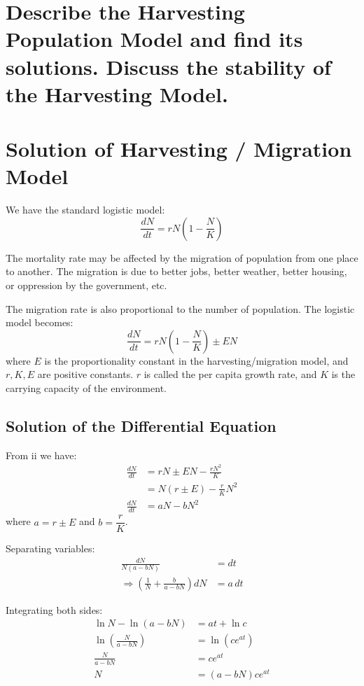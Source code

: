 \section{Describe the Harvesting Population Model and find its solutions. Discuss the stability of the Harvesting Model.}
\section*{Solution of Harvesting / Migration Model}

We have the standard logistic model:
\begin{equation}
\frac{dN}{dt} = rN \left(1 - \frac{N}{K}\right) \tag{i}
\end{equation}

The mortality rate may be affected by the migration of population from one place to another. The migration is due to better jobs, better weather, better housing, or oppression by the government, etc.

The migration rate is also proportional to the number of population. The logistic model becomes:
\begin{equation}
\frac{dN}{dt} = rN \left(1 - \frac{N}{K}\right) \pm EN \tag{ii}
\end{equation}
where $E$ is the proportionality constant in the harvesting/migration model, and $r, K, E$ are positive constants. $r$ is called the per capita growth rate, and $K$ is the carrying capacity of the environment.

\subsection*{Solution of the Differential Equation}

From ii we have:
\begin{align*}
\frac{dN}{dt} &= rN \pm EN - \frac{rN^2}{K} \\
&= N(r \pm E) - \frac{r}{K}N^2 \\
\frac{dN}{dt} &= aN - bN^2 \tag{A}
\end{align*}
where $a = r \pm E$ and $b = \dfrac{r}{K}$.

Separating variables:
\begin{align*}
\frac{dN}{N(a - bN)} &= dt\\
\Rightarrow \left( \frac{1}{N} + \frac{b}{a - bN} \right) dN &= a \, dt
\end{align*}

Integrating both sides:
\begin{align*}
\ln N - \ln(a - bN) &= at + \ln c \\
\ln \left( \frac{N}{a - bN} \right) &= \ln \left( c e^{at} \right) \\
\frac{N}{a - bN} &= c e^{at} \\
N &= (a - bN) c e^{at} \tag{iii}
\end{align*}

